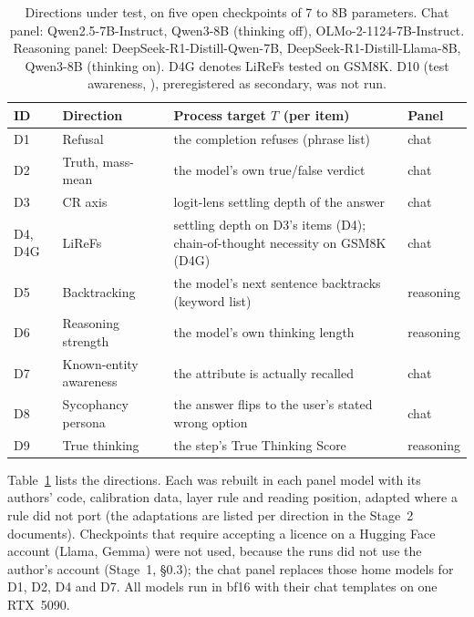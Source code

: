 \documentclass[11pt]{article}
\begin{document}
\begin{table}[t]
\centering\small
\caption{Directions under test, on five open checkpoints of 7 to 8B parameters. Chat panel: Qwen2.5-7B-Instruct, Qwen3-8B (thinking off), OLMo-2-1124-7B-Instruct. Reasoning panel: DeepSeek-R1-Distill-Qwen-7B, DeepSeek-R1-Distill-Llama-8B, Qwen3-8B (thinking on). D4G denotes LiReFs tested on GSM8K. D10 (test awareness, \citealp{abdelnabi2025testawareness}), preregistered as secondary, was not run.}
\label{tab:directions}
\begin{tabularx}{\linewidth}{@{}l l X l@{}}
\toprule
ID & Direction & Process target $T$ (per item) & Panel \\
\midrule
D1 & Refusal \citep{arditi2024refusal} & the completion refuses (phrase list) & chat \\
D2 & Truth, mass-mean \citep{marks2024geometry} & the model's own true/false verdict & chat \\
D3 & CR axis \citep{ramdan2026crv1} & logit-lens \citep{nostalgebraist2020logitlens} settling depth of the answer & chat \\
D4, D4G & LiReFs \citep{hong2025lirefs} & settling depth on D3's items (D4); chain-of-thought necessity on GSM8K (D4G) & chat \\
D5 & Backtracking \citep{ward2025backtracking} & the model's next sentence backtracks (keyword list) & reasoning \\
D6 & Reasoning strength \citep{sheng2025strength} & the model's own thinking length & reasoning \\
D7 & Known-entity awareness \citep{ferrando2025entities} & the attribute is actually recalled & chat \\
D8 & Sycophancy persona \citep{chen2025persona} & the answer flips to the user's stated wrong option & chat \\
D9 & True thinking \citep{zhao2025truethinking} & the step's True Thinking Score & reasoning \\
\bottomrule
\end{tabularx}
\end{table}

Table~\ref{tab:directions} lists the directions. Each was rebuilt in each panel model with its authors' code, calibration data, layer rule and reading position, adapted where a rule did not port (the adaptations are listed per direction in the Stage~2 documents). Checkpoints that require accepting a licence on a Hugging Face account (Llama, Gemma) were not used, because the runs did not use the author's account (Stage~1, \S0.3); the chat panel replaces those home models for D1, D2, D4 and D7. All models run in bf16 with their chat templates on one RTX~5090.
\end{document}
